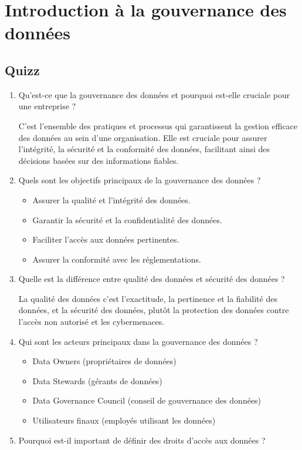 \chapter{Introduction à la gouvernance des données}

\section*{Quizz}

\begin{enumerate}
    \item Qu'est-ce que la gouvernance des données et pourquoi est-elle cruciale pour une entreprise ?

        C'est l'ensemble des pratiques et processus qui garantissent la gestion efficace des données au sein d'une organisation. Elle est cruciale pour assurer l'intégrité, la sécurité et la conformité des données, facilitant ainsi des décisions basées sur des informations fiables.
    \item Quels sont les objectifs principaux de la gouvernance des données ?

        \begin{itemize}
            \item Assurer la qualité et l'intégrité des données.
            \item Garantir la sécurité et la confidentialité des données.
            \item Faciliter l'accès aux données pertinentes.
            \item Assurer la conformité avec les réglementations.
        \end{itemize}
    \item Quelle est la différence entre qualité des données et sécurité des données ?

        La qualité des données c'est l'exactitude, la pertinence et la fiabilité des données, et la sécurité des données, plutôt la protection des données contre l'accès non autorisé et les cybermenaces.
    \item Qui sont les acteurs principaux dans la gouvernance des données ?

        \begin{itemize}
            \item Data Owners (propriétaires de données)
            \item Data Stewards (gérants de données)
            \item Data Governance Council (conseil de gouvernance des données)
            \item Utilisateurs finaux (employés utilisant les données)
        \end{itemize}
    \item Pourquoi est-il important de définir des droits d'accès aux données ?


\end{enumerate}
